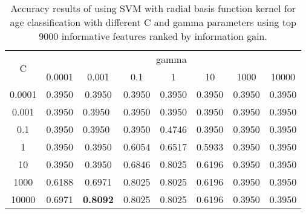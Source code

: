 \documentclass[a4paper]{llncs}
\begin{document}
\begin{table}[!htbp]
\centering
\begin{tabular}{|c|c|c|c|l|l|l|l|}
\hline
\multirow{2}{*}{C} & \multicolumn{7}{c|}{gamma}                                                                                                                                                                          \\ \cline{2-8} 
                   & 0.0001                      & 0.001                       & 0.1                         & \multicolumn{1}{c|}{1} & \multicolumn{1}{c|}{10} & \multicolumn{1}{c|}{1000} & \multicolumn{1}{c|}{10000} \\ \hline
0.0001             & 0.3950                      & 0.3950                      & 0.3950                      & 0.3950                 & 0.3950                  & 0.3950                    & 0.3950                     \\ \hline
0.001              & \multicolumn{1}{l|}{0.3950} & \multicolumn{1}{l|}{0.3950} & \multicolumn{1}{l|}{0.3950} & 0.3950                 & 0.3950                  & 0.3950                    & 0.3950                     \\ \hline
0.1                & \multicolumn{1}{l|}{0.3950} & \multicolumn{1}{l|}{0.3950} & \multicolumn{1}{l|}{0.3950} & 0.4746                 & 0.3950                  & 0.3950                    & 0.3950                     \\ \hline
1                  & 0.3950                      & 0.3950                      & 0.6054                      & 0.6517                 & 0.5933                  & 0.3950                    & 0.3950                     \\ \hline
10                 & 0.3950                      & 0.3950                      & 0.6846                      & 0.8025                 & 0.6196                  & 0.3950                    & 0.3950                     \\ \hline
1000               & 0.6188                      & 0.6971                      & 0.8025                      & 0.8025                 & 0.6196                  & 0.3950                    & 0.3950                     \\ \hline
10000              & 0.6971                      & \textbf{0.8092}             & 0.8025                      & 0.8025                 & 0.6196                  & 0.3950                    & 0.3950                     \\ \hline
\end{tabular}
\caption{Accuracy results of using SVM with radial basis function kernel for age classification with different C and gamma parameters using top 9000 informative features ranked by information gain.}
\label{table:SVMRBFAge}
\end{table}
\end{document}
